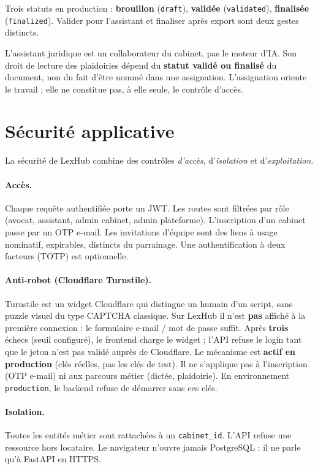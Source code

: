 Trois statuts en production : \textbf{brouillon} (\texttt{draft}), \textbf{validée} (\texttt{validated}), \textbf{finalisée} (\texttt{finalized}). Valider pour l'assistant et finaliser après export sont deux gestes distincts.

L'assistant juridique est un collaborateur du cabinet, pas le moteur d'IA. Son droit de lecture des plaidoiries dépend du \textbf{statut validé ou finalisé} du document, non du fait d'être nommé dans une assignation. L'assignation oriente le travail ; elle ne constitue pas, à elle seule, le contrôle d'accès.

\section{Sécurité applicative}
\label{sec:securite}

La sécurité de LexHub combine des contrôles \emph{d'accès}, d'\emph{isolation} et d'\emph{exploitation}.

\paragraph{Accès.}
Chaque requête authentifiée porte un JWT. Les routes sont filtrées par rôle (avocat, assistant, admin cabinet, admin plateforme). L'inscription d'un cabinet passe par un OTP e-mail. Les invitations d'équipe sont des liens à usage nominatif, expirables, distincts du parrainage. Une authentification à deux facteurs (TOTP) est optionnelle.

\paragraph{Anti-robot (Cloudflare Turnstile).}
Turnstile est un widget Cloudflare qui distingue un humain d'un script, sans puzzle visuel du type CAPTCHA classique. Sur LexHub il n'est \textbf{pas} affiché à la première connexion : le formulaire e-mail / mot de passe suffit. Après \textbf{trois} échecs (seuil configuré), le frontend charge le widget ; l'API refuse le login tant que le jeton n'est pas validé auprès de Cloudflare. Le mécanisme est \textbf{actif en production} (clés réelles, pas les clés de test). Il ne s'applique pas à l'inscription (OTP e-mail) ni aux parcours métier (dictée, plaidoirie). En environnement \texttt{production}, le backend refuse de démarrer sans ces clés.

\paragraph{Isolation.}
Toutes les entités métier sont rattachées à un \texttt{cabinet\_id}. L'API refuse une ressource hors locataire. Le navigateur n'ouvre jamais PostgreSQL : il ne parle qu'à FastAPI en HTTPS.

